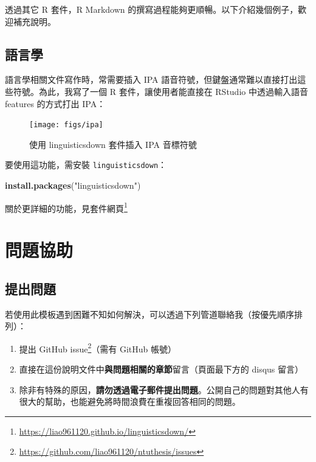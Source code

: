 \documentclass[oneside]{book}
\newenvironment{Shaded}{\begin{snugshade}}{\end{snugshade}}
\newcommand{\KeywordTok}[1]{\textcolor[rgb]{0.13,0.29,0.53}{\textbf{#1}}}
\newcommand{\NormalTok}[1]{#1}
\newcommand{\StringTok}[1]{\textcolor[rgb]{0.31,0.60,0.02}{#1}}
\renewcommand{\href}[2]{#2\footnote{\url{#1}}}
\providecommand{\tightlist}{%
  \setlength{\itemsep}{0pt}\setlength{\parskip}{0pt}}
\theoremstyle{definition}
\theoremstyle{definition}
\theoremstyle{definition}
\theoremstyle{remark}
\begin{document}
透過其它 R 套件，R Markdown 的撰寫過程能夠更順暢。以下介紹幾個例子，歡迎補充說明。

\hypertarget{ling}{%
\section{語言學}\label{ling}}

語言學相關文件寫作時，常需要插入 IPA 語音符號，但鍵盤通常難以直接打出這些符號。為此，我寫了一個 R 套件，讓使用者能直接在 RStudio 中透過輸入語音 features 的方式打出 IPA：

\begin{figure}

{\centering \texttt{[image: figs/ipa]} 

}

\caption{使用 linguisticsdown 套件插入 IPA 音標符號}\label{fig:unnamed-chunk-8}
\end{figure}

要使用這功能，需安裝 \texttt{linguisticsdown}：

\begin{Shaded}
\begin{Highlighting}[]
\KeywordTok{install.packages}\NormalTok{(}\StringTok{"linguisticsdown"}\NormalTok{)}
\end{Highlighting}
\end{Shaded}

關於更詳細的功能，見\href{https://liao961120.github.io/linguisticsdown/}{套件網頁}

\hypertarget{feed-back}{%
\chapter*{問題協助}\label{feed-back}}

\hypertarget{issue}{%
\section*{提出問題}\label{issue}}

若使用此模板遇到困難不知如何解決，可以透過下列管道聯絡我（按優先順序排列）：

\begin{enumerate}
\def\labelenumi{\arabic{enumi}.}
\tightlist
\item
  提出 \href{https://github.com/liao961120/ntuthesis/issues}{GitHub issue}（需有 GitHub 帳號）
\item
  直接在這份說明文件中\textbf{與問題相關的章節}留言（頁面最下方的 disqus 留言）
\item
  除非有特殊的原因，\textbf{請勿透過電子郵件提出問題}。公開自己的問題對其他人有很大的幫助，也能避免將時間浪費在重複回答相同的問題。
\end{enumerate}
\end{document}
